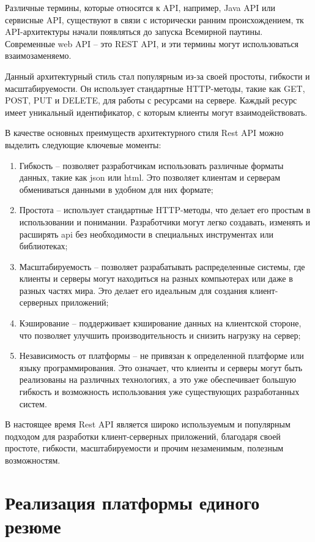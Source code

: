 \documentclass[master, och, pract]{SCWorks}
\begin{document}
Различные термины, которые относятся к API, например, Java API или сервисные API, существуют в связи с исторически ранним происхождением, тк API-архитектуры начали появляться до запуска Всемирной паутины. Современные web API – это REST API, и эти термины могут использоваться взаимозаменяемо.

Данный архитектурный стиль стал популярным из-за своей простоты, гибкости и масштабируемости. Он использует стандартные HTTP-методы, такие как GET, POST, PUT и DELETE, для работы с ресурсами на сервере. Каждый ресурс имеет уникальный идентификатор, с которым клиенты могут взаимодействовать.

В качестве основных преимуществ архитектурного стиля Rest API можно выделить следующие ключевые моменты:
\begin{enumerate}
    \item Гибкость – позволяет разработчикам использовать различные форматы данных, такие как json или html. Это позволяет клиентам и серверам обмениваться данными в удобном для них формате;
    \item Простота – использует стандартные HTTP-методы, что делает его простым в использовании и понимании. Разработчики могут легко создавать, изменять и расширять api без необходимости в специальных инструментах или библиотеках;
    \item Масштабируемость – позволяет разрабатывать распределенные системы, где клиенты и серверы могут находиться на разных компьютерах или даже в разных частях мира. Это делает его идеальным для создания клиент-серверных приложений;
    \item Кэширование – поддерживает кэширование данных на клиентской стороне, что позволяет улучшить производительность и снизить нагрузку на сервер;
    \item Независимость от платформы – не привязан к определенной платформе или языку программирования. Это означает, что клиенты и серверы могут быть реализованы на различных технологиях, а это уже обеспечивает большую гибкость и возможность использования уже существующих разработанных систем.\cite{Masse_rest}
\end{enumerate}

В настоящее время Rest API является широко используемым и популярным подходом для разработки клиент-серверных приложений, благодаря своей простоте, гибкости, масштабируемости и прочим незаменимым, полезным возможностям.






\section{Реализация платформы единого резюме}
\end{document}

